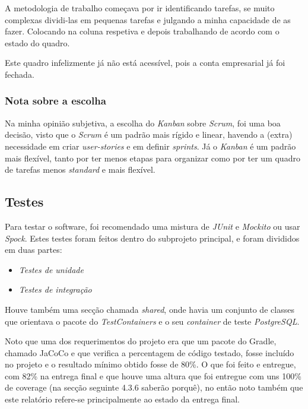 A metodologia de trabalho começava por ir identificando tarefas, se muito complexas dividi-las em pequenas tarefas e julgando a minha capacidade de as fazer. Colocando na coluna respetiva e depois trabalhando de acordo com o estado do quadro.

Este quadro infelizmente já não está acessível, pois a conta empresarial já foi fechada.

\subsubsection{Nota sobre a escolha}

Na minha opinião subjetiva, a escolha do \textit{Kanban} sobre \textit{Scrum}, foi uma boa decisão, visto que o \textit{Scrum} é um padrão mais rígido e linear, havendo a (extra) necessidade em criar \textit{user-stories} e em definir \textit{sprints}. Já o \textit{Kanban} é um padrão mais flexível, tanto por ter menos etapas para organizar como por ter um quadro de tarefas menos \textit{standard} e mais flexível.

\subsection{Testes}

Para testar o software, foi recomendado uma mistura de \textit{JUnit} e \textit{Mockito} ou usar \textit{Spock}. Estes testes foram feitos dentro do subprojeto principal, e foram divididos em duas partes:

\begin{itemize}
  \item \textit{Testes de unidade}
  \item \textit{Testes de integração}
\end{itemize}

Houve também uma secção chamada \textit{shared}, onde havia um conjunto de classes que orientava o pacote do \textit{TestContainers} e o seu \textit{container} de teste \textit{PostgreSQL}.

Noto que uma dos requerimentos do projeto era que um pacote do Gradle, chamado JaCoCo e que verifica a percentagem de código testado, fosse incluído no projeto e o resultado mínimo obtido fosse de 80\%. O que foi feito e entregue, com 82\% na entrega final e que houve uma altura que foi entregue com uns 100\% de coverage (na secção seguinte 4.3.6 saberão porquê), no então noto também que este relatório refere-se principalmente ao estado da entrega final.

